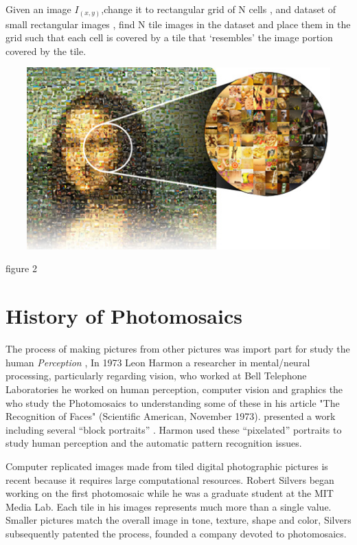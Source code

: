 \documentclass[a4paper,12pt]{report}
\begin{document}
	
	\par
	
	Given an image $ I_(x,y) $,change it to rectangular grid of N cells , and dataset of small rectangular images , find N tile images in the dataset and place them in the
	grid such that each cell is covered by a tile that ‘resembles’
	the image portion covered by the tile.
	 \\
	\par
	

\begin{center}
		\includegraphics[width=15cm, height=7cm, 
	keepaspectratio]{pixelart2} 
	
	{figure 2}\\
\end{center}

	

		


   \section{History of Photomosaics}
   
  The process of making pictures from other pictures was import part for study the human \emph{Perception } , In 1973 Leon
   Harmon a researcher in mental/neural processing, particularly regarding vision, who worked at Bell Telephone Laboratories he worked on human perception, computer vision and graphics the who study the Photomosaics to understanding some of these in his article "The Recognition of Faces" (Scientific American, November 1973).
    presented a work including several
   “block portraits” . Harmon used these
   “pixelated” portraits to study human perception and the
   automatic pattern recognition issues.
   
   Computer replicated images made from tiled digital
   photographic pictures is recent because it requires large
   computational resources. Robert Silvers began
   working on the first photomosaic while he was a graduate
   student at the MIT Media Lab. Each tile in his images
   represents much more than a single value. Smaller pictures
   match the overall image in tone, texture, shape and color, Silvers subsequently patented the process, founded a company devoted to photomosaics.
  
\end{document}
